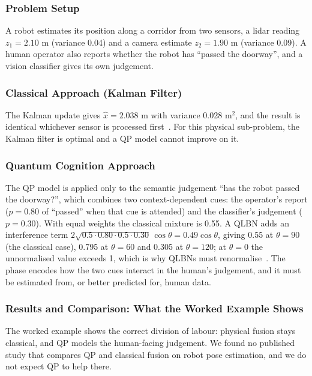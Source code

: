 \documentclass[pdflatex,sn-basic]{sn-jnl}
\begin{document}
\subsubsection{Problem Setup}
A robot estimates its position along a corridor from two sensors, a lidar reading $z_1 = 2.10$ m (variance 0.04) and a camera estimate $z_2 = 1.90$ m (variance 0.09). A human operator also reports whether the robot has ``passed the doorway'', and a vision classifier gives its own judgement.

\subsubsection{Classical Approach (Kalman Filter)}
The Kalman update gives $\hat{x} = 2.038$ m with variance 0.028 m$^2$, and the result is identical whichever sensor is processed first~\citep{Kalman1960}. For this physical sub-problem, the Kalman filter is optimal and a QP model cannot improve on it.

\subsubsection{Quantum Cognition Approach}
The QP model is applied only to the semantic judgement ``has the robot passed the doorway?'', which combines two context-dependent cues: the operator's report ($p = 0.80$ of ``passed'' when that cue is attended) and the classifier's judgement ($p = 0.30$). With equal weights the classical mixture is 0.55. A QLBN adds an interference term $2\sqrt{0.5 \cdot 0.80 \cdot 0.5 \cdot 0.30}\,\cos\theta = 0.49\cos\theta$, giving 0.55 at $\theta = 90$\textdegree{} (the classical case), 0.795 at $\theta = 60$\textdegree{} and 0.305 at $\theta = 120$\textdegree{}; at $\theta = 0$ the unnormalised value exceeds 1, which is why QLBNs must renormalise~\citep{Moreira2016,Wichert2020}. The phase encodes how the two cues interact in the human's judgement, and it must be estimated from, or better predicted for, human data.

\subsubsection{Results and Comparison: What the Worked Example Shows}
The worked example shows the correct division of labour: physical fusion stays classical, and QP models the human-facing judgement. We found no published study that compares QP and classical fusion on robot pose estimation, and we do not expect QP to help there.
\end{document}

